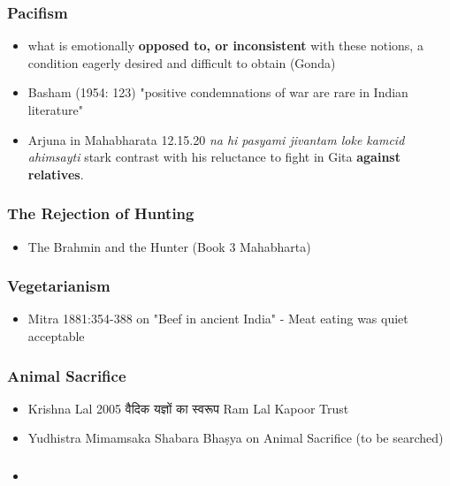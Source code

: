 \documentclass[pdf]{beamer}
\begin{document}
\begin{frame}\frametitle{Pacifism}
\begin{itemize}
\item what is emotionally \textbf {opposed to, or inconsistent} with these notions, a condition eagerly desired and difficult to obtain (Gonda)
\item Basham (1954: 123) "positive condemnations of war are rare in Indian literature"
	\item Arjuna in Mahabharata 12.15.20 \textit{na hi pasyami jivantam loke kamcid ahimsayti} stark contrast with his reluctance to fight in Gita \textbf{against 		relatives}.
	\end{itemize}
\end{frame}

\begin{frame}\frametitle{The Rejection of Hunting}
\begin{itemize}
\item The Brahmin and the Hunter (Book 3 Mahabharta)
\end{itemize}
\end{frame}

\begin{frame}\frametitle{Vegetarianism}
\begin{itemize}
\item  Mitra 1881:354-388 on "Beef in ancient India" - Meat eating was quiet acceptable
\end{itemize}
\end{frame}

\begin{frame}\frametitle{Animal Sacrifice}
\begin{itemize}
\item Krishna Lal 2005 वैदिक यज्ञों का स्वरूप Ram Lal Kapoor Trust
\item Yudhistra Mimamsaka Shabara Bhaṣya on Animal Sacrifice (to be searched)
\end{itemize}
\end{frame}

\begin{frame}\frametitle{}
\begin{itemize}
\item 
\end{itemize}
\end{frame}

\end{document}
